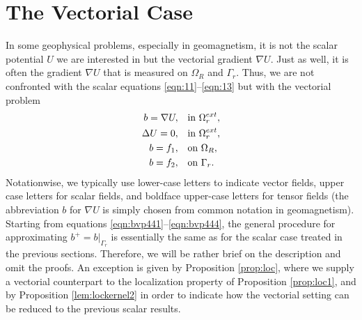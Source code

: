 \documentclass[a4paper, 10pt]{article}
\numberwithin{equation}{section}
\theoremstyle{definition}
\begin{document}
\newpage


\section{The Vectorial Case}\label{sec:vect}%

In some geophysical problems, especially in geomagnetism, it is not the scalar potential $U$ we are interested in but the vectorial gradient $\nabla U$. Just as well, it is often the gradient $\nabla U$ that is measured on $\Omega_R$ and $\Gamma_r$. Thus, we are not confronted with the scalar equations \eqref{eqn:11}--\eqref{eqn:13} but with the vectorial problem
\begin{align}
b=\nabla U,&\quad \textnormal{in }\Omega_r^{ext},\label{eqn:bvp441}
\\\Delta U=0,&\quad \textnormal{in }\Omega_r^{ext},\label{eqn:bvp442}
\\b=f_1,&\quad \textnormal{on }\Omega_R,\label{eqn:bvp443}
\\b=f_2,&\quad \textnormal{on }\Gamma_r.\label{eqn:bvp444}
\end{align}
Notationwise, we typically use lower-case letters to indicate vector fields, upper case letters for scalar fields, and boldface upper-case letters for tensor fields (the abbreviation $b$ for $\nabla U$ is simply chosen from common notation in geomagnetism). Starting from equations \eqref{eqn:bvp441}--\eqref{eqn:bvp444}, the general procedure for approximating $b^+=b|_{\Gamma_r}$  is essentially the same as for the scalar case treated in the previous sections. Therefore, we will be rather brief on the description and omit the proofs. An exception is given by Proposition \ref{prop:loc}, where we supply a vectorial counterpart to the localization property of Proposition \ref{prop:loc1}, and by Proposition \ref{lem:lockernel2} in order to indicate how the vectorial setting can be reduced to the previous scalar results.
\end{document}
